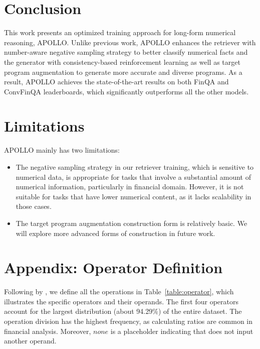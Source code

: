 \documentclass[11pt]{article}
\begin{document}
\section{Conclusion}
This work presents an optimized training approach for long-form numerical reasoning, APOLLO. Unlike previous work, APOLLO enhances the retriever with number-aware negative sampling strategy to better classify numerical facts and the generator with consistency-based reinforcement learning as well as target program augmentation to generate more accurate and diverse programs. As a result, APOLLO achieves the state-of-the-art results on both FinQA and ConvFinQA leaderboards, which significantly outperforms all the other models.


\section*{Limitations}
APOLLO mainly has two limitations:
\begin{itemize}
\item The negative sampling strategy in our retriever training, which is sensitive to numerical data, is appropriate for tasks that involve a substantial amount of numerical information, particularly in financial domain. However, it is not suitable for tasks that have lower numerical content, as it lacks scalability in those cases.
\item The target program augmentation construction form is relatively basic. We will explore more advanced forms of construction in future work.
    

\end{itemize}





\newpage

\appendix

\section{Appendix: Operator Definition}
\label{appendix:operator_definition}
Following by \citet{chen2021finqa}, we define all the operations in Table~\ref{table:operator}, which illustrates the specific operators and their operands.
The first four operators account for the largest distribution (about 94.29\%) of the entire dataset. The operation division has the highest frequency, as calculating ratios are common in financial analysis. Moreover, $none$ is a placeholder indicating that does not input another operand.
\end{document}
